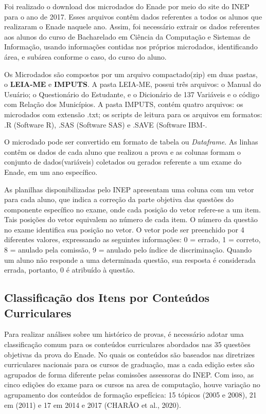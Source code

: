 \documentclass[12pt]{article}
\begin{document}
Foi realizado o download dos microdados do Enade por meio do site do INEP
para o ano de 2017. Esses arquivos contêm dados referentes a todos os alunos que realizaram o Enade naquele ano. Assim, foi necessário extrair os dados referentes aos alunos do curso de Bacharelado em Ciência da Computação e Sistemas de Informação, usando informações contidas nos próprios microdados, identificando área, e subárea conforme o caso, do curso do aluno. 

Os Microdados são compostos por um arquivo compactado(zip) em duas pastas, o \textbf{LEIA-ME} e \textbf{IMPUTS}. A pasta LEIA-ME, possui três arquivos: o Manual do Usuário; o Questionário do Estudante, e o Dicionário de 137 Variáveis e o código com Relação dos Municípios. A pasta IMPUTS, contém quatro arquivos: os microdados com extensão .txt; os scripts de leitura para os arquivos em formatos: .R (Software R), .SAS (Software SAS) e .SAVE (Software IBM-.

O microdado pode ser convertido em formato de tabela ou \textit{Dataframe}. As linhas contêm os dados de cada aluno que realizou a prova e as colunas formam o conjunto de dados(variáveis) coletados ou gerados referente a um exame do Enade, em um ano específico.


As planilhas disponibilizadas pelo INEP apresentam uma coluna com um vetor para cada aluno, que
indica a correção da parte objetiva das questões do componente específico no exame, onde cada posição do vetor refere-se a um item. Tais posições do vetor equivalem ao número de cada item. O número da questão no exame identifica sua posição no vetor. O vetor pode ser preenchido por 4 diferentes valores, expressando as seguintes informações: 0 = errado, 1 = correto, 8 = anulado pela comissão, 9 = anulado pelo índice de discriminação. Quando um aluno não responde a uma determinada questão, sua resposta é considerada errada, portanto, 0 é atribuído à
questão.

\subsection{Classificação dos Itens por Conteúdos Curriculares}

Para realizar análises sobre um histórico de provas, é necessário adotar uma classificação comum para os conteúdos curriculares abordados nas 35 questões objetivas da prova do Enade. No quais os conteúdos são baseados nas diretrizes curriculares nacionais para os cursos de graduação, mas a cada edição estes são agrupados de forma diferente pelas comissões assessoras do INEP. Com isso, as cinco edições do exame para os cursos na area de computação, houve variação no agrupamento dos conteúdos de formação espefícica: 15 tópicos (2005 e 2008), 21 em (2011) e 17 em 2014 e 2017 (CHARÃO et al., 2020).
\end{document}
